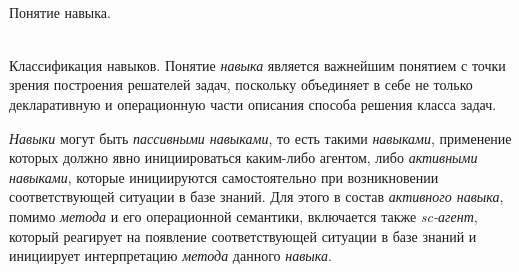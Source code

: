 \begin{frame}{\\Понятие навыка.}
	\topline
	\justifying
        \begin{SCn}
        \end{SCn}
\end{frame}

\begin{frame}{\\Классификация навыков.}
	\topline
	\justifying
Понятие \textit{навыка} является важнейшим понятием с точки зрения построения решателей задач, поскольку объединяет в себе не только декларативную и операционную части описания способа решения класса задач.

\textit{Навыки} могут быть \textit{пассивными навыками}, то есть такими \textit{навыками}, применение которых должно явно инициироваться каким-либо агентом, либо \textit{активными навыками}, которые инициируются самостоятельно при возникновении соответствующей ситуации в базе знаний. Для этого в состав \textit{активного навыка}, помимо \textit{метода} и его операционной семантики, включается также \textit{sc-агент}, который реагирует на появление соответствующей ситуации в базе знаний и инициирует интерпретацию \textit{метода} данного \textit{навыка}.
\end{frame}

	
